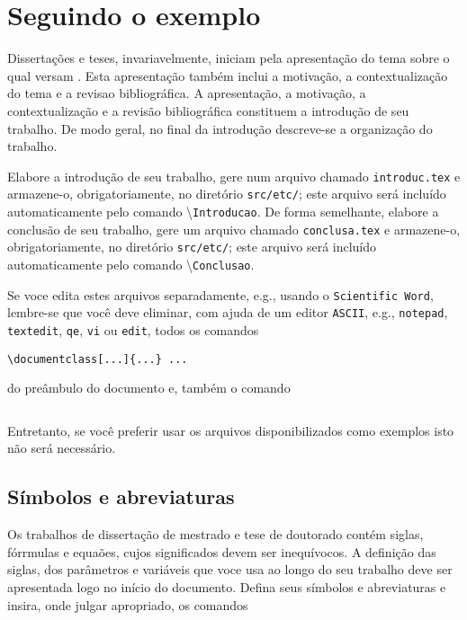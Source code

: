 
\chapter{Seguindo o exemplo\label{cap2}}

Dissertações e teses, invariavelmente, iniciam pela
apresentação do tema sobre o qual versam \cite{SP}. Esta
apresentação também inclui a motivação, a
contextualização do tema e a revisao bibliográfica. A
apresentação, a motivação, a contextualização e a
revisão bibliográfica constituem a introdução de seu trabalho.
De modo geral, no final da introdução descreve-se a
organização do trabalho.

Elabore a introdução de seu trabalho, gere num
arquivo chamado \texttt{introduc.tex} e armazene-o, obrigatoriamente, no diretório \texttt{src/etc/}; este arquivo será incluído automaticamente pelo comando \textbackslash\texttt{Introducao}. De forma semelhante, elabore a conclusão de seu trabalho, gere um arquivo chamado \texttt{conclusa.tex} e armazene-o, obrigatoriamente, no diretório \texttt{src/etc/}; este arquivo será incluído automaticamente pelo comando \textbackslash\texttt{Conclusao}. 

Se voce edita estes arquivos separadamente, e.g., usando o \texttt{Scientific Word}, lembre-se que você deve eliminar, com ajuda de um editor \texttt{ASCII},
e.g., \texttt{notepad}, \texttt{textedit}, \texttt{qe}, \texttt{vi} ou \texttt{edit}, todos os comandos
\begin{verbatim}
\documentclass[...]{...} ... 
\end{verbatim}
\noindent do preâmbulo do documento e, também o comando
\begin{verbatim}

\end{verbatim}

Entretanto, se você preferir usar os arquivos disponibilizados como exemplos isto não será necessário.

\section{Símbolos e abreviaturas}

Os trabalhos de dissertação de mestrado e tese de doutorado contém
siglas, fórrmulas e equaões, cujos significados devem ser
inequívocos. A definição das siglas, dos parâmetros e
variáveis que voce usa ao longo do seu trabalho deve ser apresentada logo
no início do documento. Defina seus símbolos e abreviaturas e
insira, onde julgar apropriado, os comandos

